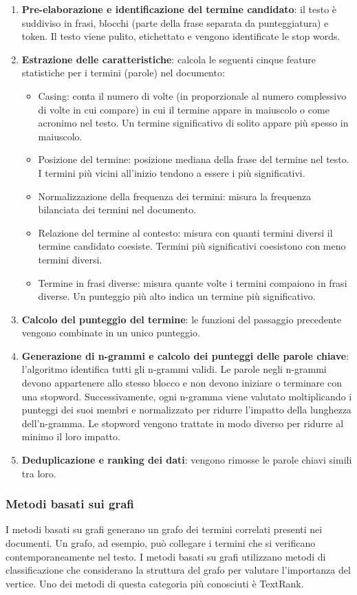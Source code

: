 \begin{enumerate}
\item \textbf{Pre-elaborazione e identificazione del termine candidato}: il testo è suddiviso in frasi, blocchi (parte della frase separata da punteggiatura) e token. Il testo viene pulito, etichettato e vengono identificate le stop words.
\item \textbf{Estrazione delle caratteristiche}: calcola le seguenti cinque feature statistiche per i termini (parole) nel documento:
\begin{itemize}
\item Casing: conta il numero di volte (in proporzionale al numero complessivo di volte in cui compare) in cui il termine appare in maiuscolo o come acronimo nel testo. Un termine significativo di solito appare più spesso in maiuscolo.
\item Posizione del termine: posizione mediana della frase del termine nel testo. I termini più vicini all'inizio tendono a essere i più significativi.
\item Normalizzazione della frequenza dei termini: misura la frequenza bilanciata dei termini nel documento.
\item Relazione del termine al contesto: misura con quanti termini diversi il termine candidato coesiste. Termini più significativi coesistono con meno termini diversi. 
\item Termine in frasi diverse: misura quante volte i termini compaiono in frasi diverse. Un punteggio più alto indica un termine più significativo.
\end{itemize}
\item \textbf{Calcolo del punteggio del termine}: le funzioni del passaggio precedente vengono combinate in un unico punteggio.
\item \textbf{Generazione di n-grammi e calcolo dei punteggi delle parole chiave}: l'algoritmo identifica tutti gli n-grammi validi. Le parole negli n-grammi devono appartenere allo stesso blocco e non devono iniziare o terminare con una stopword. Successivamente, ogni n-gramma viene valutato moltiplicando i punteggi dei suoi membri e normalizzato per ridurre l'impatto della lunghezza dell'n-gramma. Le stopword vengono trattate in modo diverso per ridurre al minimo il loro impatto.
\item \textbf{Deduplicazione e ranking dei dati}: vengono rimosse le parole chiavi simili tra loro.
\end{enumerate}

\subsubsection{Metodi basati sui grafi}
I metodi basati su grafi generano un grafo dei termini correlati presenti nei documenti. Un grafo, ad esempio, può collegare i termini che si verificano contemporaneamente nel testo. I metodi basati su grafi utilizzano metodi di classificazione che considerano la struttura del grafo per valutare l'importanza del vertice. Uno dei metodi di questa categoria più conosciuti è TextRank.

